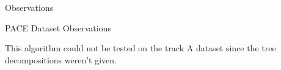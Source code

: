 \begin{section}{Observations}
\begin{subsection}{PACE Dataset Observations}
	\end{subsection}

	This algorithm could not be tested on the track A dataset since the tree decompositions weren't given. 
	
\end{section}